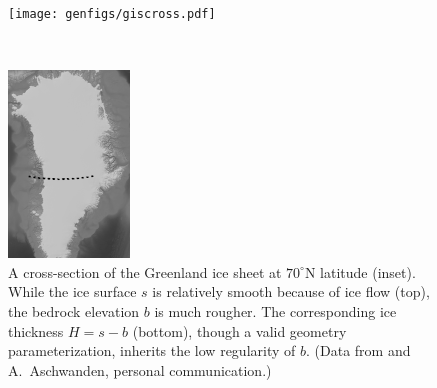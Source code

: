\documentclass[hidelinks,onefignum,onetabnum,final]{siamart220329}  %
\begin{document}
\begin{figure}
\begin{minipage}[t]{0.85\textwidth}
\vspace{0pt}
\texttt{[image: genfigs/giscross.pdf]}
\end{minipage}
\,
\begin{minipage}[t]{0.13\textwidth}
\vspace{10pt}
\includegraphics[width=\textwidth]{genfigs/gis/gris-profile-gray.png}
\end{minipage}
\caption{A cross-section of the Greenland ice sheet at $70^\circ$N latitude (inset).  While the ice surface $s$ is relatively smooth because of ice flow (top), the bedrock elevation $b$ is much rougher.  The corresponding ice thickness $H = s-b$ (bottom), though a valid geometry parameterization, inherits the low regularity of $b$.  (Data from \cite{Morlighemetal2017} and A.~Aschwanden, personal communication.)}
\label{fig:giscross}
\end{figure}
\end{document}
